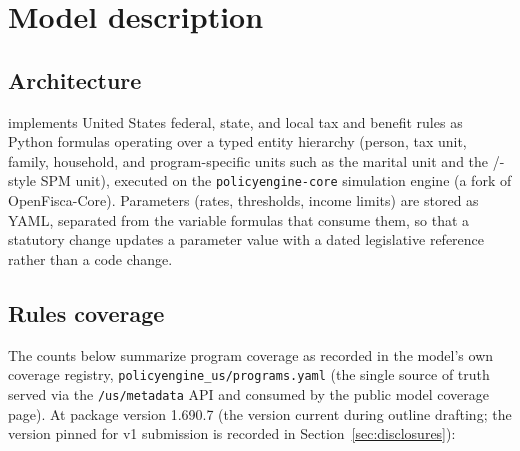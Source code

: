 \section{Model description}
\label{sec:model}

\subsection{Architecture}
\label{sec:architecture}

\policyengineus{} implements United States federal, state, and local tax and
benefit rules as Python formulas operating over a typed entity hierarchy
(person, tax unit, family, household, and program-specific units such as the
marital unit and the \acs{}/\cps{}-style SPM unit), executed on the
\texttt{policyengine-core} simulation engine (a fork of OpenFisca-Core).
 Parameters (rates, thresholds, income limits) are stored
as YAML, separated from the variable formulas that consume them, so that a
statutory change updates a parameter value with a dated legislative
reference rather than a code change.


\subsection{Rules coverage}
\label{sec:coverage}

 The counts below summarize program coverage as recorded in the
model's own coverage registry,
\texttt{policyengine\_us/programs.yaml} (the single source of truth served
via the \texttt{/us/metadata} API and consumed by the public model coverage
page). At \policyengineus{} package version 1.690.7 (the version current
during outline drafting; the version pinned for v1 submission is recorded in
Section~\ref{sec:disclosures}):

